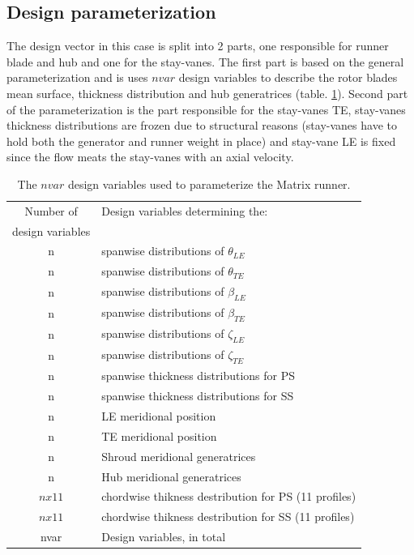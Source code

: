 \subsection{Design parameterization}
The design vector in this case is split into 2 parts, one responsible for runner blade and hub and one for the stay-vanes. The first part is based on the general parameterization and is uses $nvar$ design variables to describe the rotor blades mean surface, thickness distribution and hub generatrices (table. \ref{design_vars2}). Second part of the parameterization is the part responsible for the stay-vanes TE, stay-vanes thickness distributions are frozen due to structural reasons (stay-vanes have to hold both the generator and runner weight in place) and stay-vane LE is fixed since the flow meats the stay-vanes with an axial velocity.       

\begin{table}[h!]
\begin{center}
\begin{tabular}{ |c|l| }
\hline

Number of              & Design variables determining the:\\
design variables       & \\
\hline
n & spanwise distributions of $\theta_{LE}$\\
\hline
n & spanwise distributions of $\theta_{TE}$\\
\hline
n & spanwise distributions of $\beta_{LE}$\\
\hline
n & spanwise distributions of $\beta_{TE}$\\
\hline
n & spanwise distributions of $\zeta_{LE}$\\
\hline
n & spanwise distributions of $\zeta_{TE}$\\
\hline
n & spanwise thickness distributions for PS \\
\hline
n & spanwise thickness distributions for SS\\
\hline
n & LE meridional position\\
\hline
n & TE meridional position\\
\hline
n & Shroud meridional generatrices \\
\hline
n & Hub meridional generatrices\\
\hline
$n x 11$ & chordwise thikness destribution for PS (11 profiles)\\
\hline
$n x 11$ & chordwise thikness destribution for SS (11 profiles)\\
\hline
\hline
nvar & Design variables, in total \\
\hline   
\end{tabular}
\caption{
The $nvar$ design variables used to parameterize the Matrix runner.}
\label{design_vars2}
\end{center}
\end{table}

